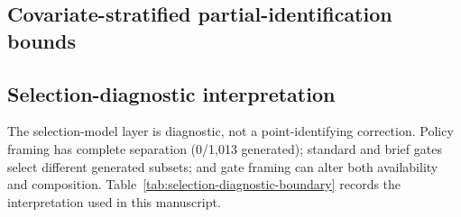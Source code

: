 \documentclass[11pt,a4paper]{article}
\begin{document}
\subsection{Covariate-stratified partial-identification bounds}\label{app:covariate-stratified-bounds}

\begin{center}
\scriptsize
{}
\label{tab:domain-pi-bounds}
\end{center}


\subsection{Selection-diagnostic interpretation}\label{app:selection-diagnostic-interpretation}

The selection-model layer is diagnostic, not a point-identifying correction. Policy framing has complete separation (0/1,013 generated); standard and brief gates select different generated subsets; and gate framing can alter both availability and composition. Table~\ref{tab:selection-diagnostic-boundary} records the interpretation used in this manuscript.
\end{document}
